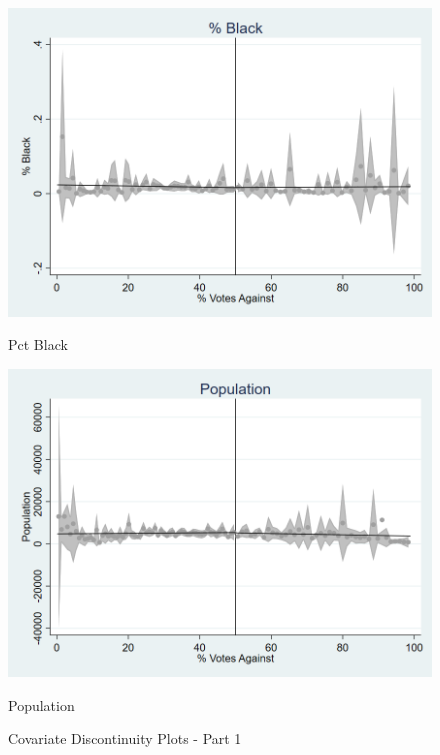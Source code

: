 \begin{figure}[ht]
    \begin{minipage}[b]{0.40\textwidth}
        \centering
        \includegraphics[width=\textwidth,keepaspectratio]{images/cov_smoothness_pctblack.png}
        \caption*{Pct Black}
        \label{fig:black_sm}
    \end{minipage}
    \hfill
    \begin{minipage}[b]{0.40\textwidth}
        \centering
        \includegraphics[width=\textwidth,keepaspectratio]{images/cov_smoothness_pop.png}
        \caption*{Population}
        \label{fig:pop_sm}
    \end{minipage}
    
    \caption{Covariate Discontinuity Plots - Part 1}
    \label{fig:rd_cov_smoothness_1}
\end{figure}

